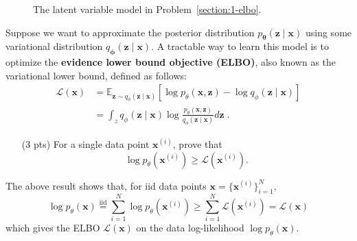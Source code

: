\begin{figure}[h!]
    \centering
    \caption{The latent variable model in Problem~\ref{section:1-elbo}.}
    \label{fig:vae}
\end{figure}

Suppose we want to approximate the posterior distribution $p_{\boldsymbol \theta}(\mathbf{z} \mid \mathbf{x})$ using some variational distribution $q_{\boldsymbol \phi}(\mathbf{z} \mid \mathbf{x})$. A tractable way to learn this model is to optimize the \textbf{evidence lower bound objective (ELBO)}, also known as the variational lower bound, defined as follows:
\begin{align*}
\mathcal{L}(\mathbf{x})
&= \mathbb{E}_{\mathbf{z} \sim q_\phi(\mathbf{z} \mid \mathbf{x})} [\log p_\theta(\mathbf{x}, \mathbf{z}) - \log q_\phi(\mathbf{z} \mid \mathbf{x})] \\
&= \int_z q_\phi(\mathbf{z} \mid \mathbf{x}) \log \frac{p_\theta(\mathbf{x}, \mathbf{z})}{q_\phi(\mathbf{z} \mid \mathbf{x})} d \mathbf{z}
\; .
\end{align*}

\begin{itemize}
    \item[(3 pts)] For a single data point $\mathbf{x}^{(i)}$, prove that
    \[
    \log p_\theta(\mathbf{x}^{(i)})
    \geq \mathcal{L}(\mathbf{x}^{(i)}).
    \]
    \begin{solution}
    \end{solution}
\end{itemize}

The above result shows that, for iid data points $\mathbf{x} = \{\mathbf{x}^{(i)}\}_{i=1}^N$,
    \[
    \log p_\theta(\mathbf{x}) \stackrel{\text{iid}}{=} \sum_{i=1}^N \log p_\theta(\mathbf{x}^{(i)})
    \geq \sum_{i=1}^N \mathcal{L}(\mathbf{x}^{(i)})
    = \mathcal{L}(\mathbf{x})
    \]
    which gives the ELBO $\mathcal{L}(\mathbf{x})$ on the data log-likelihood $\log p_\theta(\mathbf{x})$.

